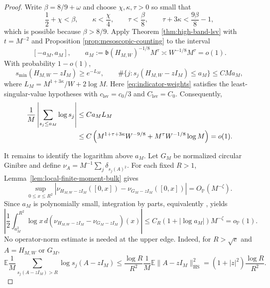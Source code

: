 \documentclass[11pt,reqno]{amsart}
\numberwithin{equation}{section}
\theoremstyle{definition}
\theoremstyle{remark}
\newcommand{\E}{\mathbb E}
\newcommand{\Pp}{\mathbb P}
\newcommand{\1}{\mathbf 1}
\newcommand{\HS}{\mathrm{HS}}
\begin{document}
\begin{proof}
Write $\beta=8/9+\omega$ and choose $\chi,\kappa,\tau>0$ so small that
\begin{equation}\label{eq:hard-edge-parameter-choice}
 \frac12+\chi<\beta,\qquad \kappa<\frac\chi4,\qquad
 \tau<\frac\beta8,\qquad \tau+3\kappa<\frac{9\beta}{8}-1,
\end{equation}
which is possible because $\beta>8/9$.  Apply Theorem
\ref{thm:high-band-lsv} with $t=M^{-2}$ and Proposition
\ref{prop:mesoscopic-counting} to the interval
\[
 [-a_M,a_M],\qquad
 a_M:=\mathfrak b(H_{M,W})^{-1/8}M^\tau
 \asymp W^{-1/8}M^\tau=o(1).
\]
With probability $1-o(1)$,
\[
 s_{\min}(H_{M,W}-zI_M)\ge e^{-L_M},\qquad
 \#\{j:s_j(H_{M,W}-zI_M)\le a_M\}\le CMa_M,
\]
where $L_M=M^{1+3\kappa}/W+2\log M$.  Here
\eqref{eq:indicator-weights} satisfies the least-singular-value hypotheses
with $c_{\mathrm{lsv}}=c_0/3$ and
$C_{\mathrm{lsv}}=C_0$.  Consequently,
\begin{align}
 \frac1M\left|\sum_{s_j\le a_M}\log s_j\right|
 &\le Ca_ML_M \notag\\
 &\le C\left(M^{1+\tau+3\kappa}W^{-9/8}
       +M^\tau W^{-1/8}\log M\right)=o(1).       \label{eq:hard-edge-sum}
\end{align}

It remains to identify the logarithm above $a_M$.  Let $G_M$ be normalized
circular Ginibre and define $\nu_A=M^{-1}\sum_j\delta_{s_j(A)^2}$.
For each fixed $R>1$, Lemma~\ref{lem:local-finite-moment-bulk} gives
\begin{equation}\label{eq:finite-moment-bulk-comparison}
 \sup_{0\le x\le R^2}
 |\nu_{H_{M,W}-zI_M}([0,x])-\nu_{G_M-zI_M}([0,x])|
 =O_{\Pp}(M^{-\zeta}).
\end{equation}
Since $a_M$ is polynomially small, integration by parts, equivalently
\cite[Lemma~4.2]{Han2410}, yields
\begin{equation}\label{eq:truncated-log-bulk-comparison}
 \left|\frac12\int_{a_M^2}^{R^2}\log x\,
 d(\nu_{H_{M,W}-zI_M}-\nu_{G_M-zI_M})(x)\right|
 \le C_R(1+|\log a_M|)M^{-\zeta}=o_{\Pp}(1).
\end{equation}
No operator-norm estimate is needed at the upper edge.  Indeed, for
$R>\sqrt e$ and $A=H_{M,W}$ or $G_M$,
\begin{equation}\label{eq:upper-log-tail-second-moment}
 \E\frac1M\sum_{s_j(A-zI_M)>R}\log s_j(A-zI_M)
 \le \frac{\log R}{R^2}\frac1M\E\|A-zI_M\|_{\HS}^2
 =(1+|z|^2)\frac{\log R}{R^2}.
\end{equation}


\end{proof}
\end{document}
